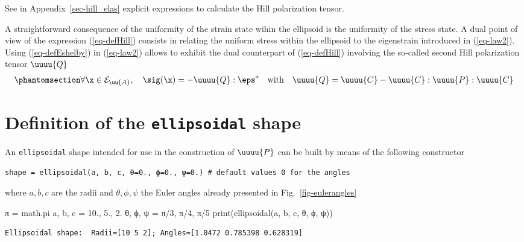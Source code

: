 \documentclass[
  letterpaper,
  DIV=11,
  numbers=noendperiod]{scrreprt}
\newenvironment{Shaded}{\begin{snugshade}}{\end{snugshade}}
\newcommand{\BuiltInTok}[1]{\textcolor[rgb]{0.00,0.23,0.31}{#1}}
\newcommand{\DecValTok}[1]{\textcolor[rgb]{0.68,0.00,0.00}{#1}}
\newcommand{\FloatTok}[1]{\textcolor[rgb]{0.68,0.00,0.00}{#1}}
\newcommand{\NormalTok}[1]{\textcolor[rgb]{0.00,0.23,0.31}{#1}}
\newcommand{\OperatorTok}[1]{\textcolor[rgb]{0.37,0.37,0.37}{#1}}
\begin{document}
See in Appendix~\ref{sec-hill_elas} explicit expressions to calculate
the Hill polarization tensor.

A straightforward consequence of the uniformity of the strain state
wihin the ellipsoid is the uniformity of the stress state. A dual point
of view of the expression (\ref{eq-defHill}) consists in relating the
uniform stress within the ellipsoid to the eigenstrain introduced in
(\ref{eq-law2}). Using (\ref{eq-defEshelby}) in (\ref{eq-law2}) allows
to exhibit the dual counterpart of (\ref{eq-defHill}) involving the
so-called second Hill polarization tensor \(\uuuu{Q}\)
\begin{equation}\phantomsection\label{eq-defsecondHill}{
   \forall \x \in \mathcal{E}_{\uu{A}},\quad \sig(\x)=-\uuuu{Q}:\eps^*\quad\textrm{with}\quad\uuuu{Q}=\uuuu{C}-\uuuu{C}:\uuuu{P}:\uuuu{C}
}\end{equation}

\section{\texorpdfstring{Definition of the \texttt{ellipsoidal}
shape}{Definition of the ellipsoidal shape}}\label{sec-ellipsoidal}

An \texttt{ellipsoidal} shape intended for use in the construction of
\(\uuuu{P}\) can be built by means of the following constructor

\texttt{shape\ =\ ellipsoidal(a,\ b,\ c,\ θ=0.,\ ϕ=0.,\ ψ=0.)\ \#\ default\ values\ 0\ for\ the\ angles}

where \(a, b, c\) are the radii and \(\theta, \phi, \psi\) the Euler
angles already presented in Fig.~\ref{fig-eulerangles}

\begin{Shaded}
\begin{Highlighting}[]
\NormalTok{π }\OperatorTok{=}\NormalTok{ math.pi}
\NormalTok{a, b, c }\OperatorTok{=} \FloatTok{10.}\NormalTok{, }\FloatTok{5.}\NormalTok{, }\FloatTok{2.}
\NormalTok{θ, ϕ, ψ }\OperatorTok{=}\NormalTok{ π}\OperatorTok{/}\DecValTok{3}\NormalTok{, π}\OperatorTok{/}\DecValTok{4}\NormalTok{, π}\OperatorTok{/}\DecValTok{5}
\BuiltInTok{print}\NormalTok{(ellipsoidal(a, b, c, θ, ϕ, ψ))}
\end{Highlighting}
\end{Shaded}

\begin{verbatim}
Ellipsoidal shape:  Radii=[10 5 2]; Angles=[1.0472 0.785398 0.628319]
\end{verbatim}
\end{document}
